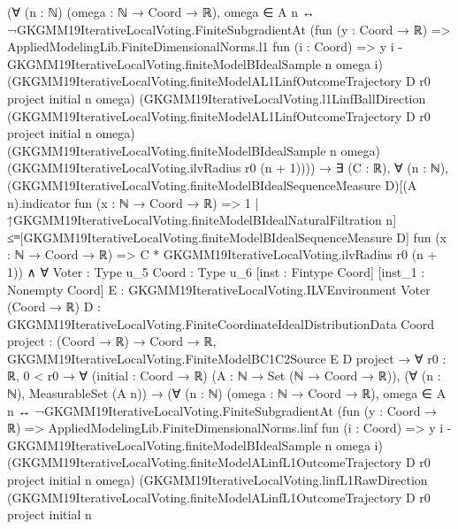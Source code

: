 \documentclass[10pt]{article}
\begin{document}
\begin{ReviewVerbatim}
                (∀ (n : ℕ) (omega : ℕ → Coord → ℝ),
                    omega ∈ A n ↔
                      ¬GKGMM19IterativeLocalVoting.FiniteSubgradientAt
                          (fun (y : Coord → ℝ) =>
                            AppliedModelingLib.FiniteDimensionalNorms.l1 fun (i : Coord) =>
                              y i - GKGMM19IterativeLocalVoting.finiteModelBIdealSample n omega i)
                          (GKGMM19IterativeLocalVoting.finiteModelAL1LinfOutcomeTrajectory D r0 project initial n omega)
                          (GKGMM19IterativeLocalVoting.l1LinfBallDirection
                            (GKGMM19IterativeLocalVoting.finiteModelAL1LinfOutcomeTrajectory D r0 project initial n
                              omega)
                            (GKGMM19IterativeLocalVoting.finiteModelBIdealSample n omega)
                            (GKGMM19IterativeLocalVoting.ilvRadius r0 (n + 1)))) →
                  ∃ (C : ℝ),
                    ∀ (n : ℕ),
                      (GKGMM19IterativeLocalVoting.finiteModelBIdealSequenceMeasure
                            D)[(A n).indicator fun (x : ℕ → Coord → ℝ) => 1 |
                          ↑GKGMM19IterativeLocalVoting.finiteModelBIdealNaturalFiltration
                            n] ≤ᵐ[GKGMM19IterativeLocalVoting.finiteModelBIdealSequenceMeasure D]
                        fun (x : ℕ → Coord → ℝ) => C * GKGMM19IterativeLocalVoting.ilvRadius r0 (n + 1)) ∧
    ∀ {Voter : Type u_5} {Coord : Type u_6} [inst : Fintype Coord] [inst_1 : Nonempty Coord]
      {E : GKGMM19IterativeLocalVoting.ILVEnvironment Voter (Coord → ℝ)}
      {D : GKGMM19IterativeLocalVoting.FiniteCoordinateIdealDistributionData Coord} {project : (Coord → ℝ) → Coord → ℝ},
      GKGMM19IterativeLocalVoting.FiniteModelBC1C2Source E D project →
        ∀ {r0 : ℝ},
          0 < r0 →
            ∀ (initial : Coord → ℝ) (A : ℕ → Set (ℕ → Coord → ℝ)),
              (∀ (n : ℕ), MeasurableSet (A n)) →
                (∀ (n : ℕ) (omega : ℕ → Coord → ℝ),
                    omega ∈ A n ↔
                      ¬GKGMM19IterativeLocalVoting.FiniteSubgradientAt
                          (fun (y : Coord → ℝ) =>
                            AppliedModelingLib.FiniteDimensionalNorms.linf fun (i : Coord) =>
                              y i - GKGMM19IterativeLocalVoting.finiteModelBIdealSample n omega i)
                          (GKGMM19IterativeLocalVoting.finiteModelALinfL1OutcomeTrajectory D r0 project initial n omega)
                          (GKGMM19IterativeLocalVoting.linfL1RawDirection
                            (GKGMM19IterativeLocalVoting.finiteModelALinfL1OutcomeTrajectory D r0 project initial n

\end{ReviewVerbatim}
\end{document}
